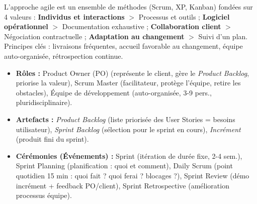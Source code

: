 \documentclass[11pt]{article}
\newcommand{\cle}[1]{{\popxbold\color{popdark}#1}}
\begin{document}
\begin{definition}
L'\cle{approche agile} est un ensemble de méthodes (Scrum, XP, Kanban) fondées sur 4 valeurs : \textbf{Individus et interactions} $>$ Processus et outils ; \textbf{Logiciel opérationnel} $>$ Documentation exhaustive ; \textbf{Collaboration client} $>$ Négociation contractuelle ; \textbf{Adaptation au changement} $>$ Suivi d'un plan. Principes clés : livraisons fréquentes, accueil favorable au changement, équipe auto-organisée, rétrospection continue.
\end{definition}

\begin{exemplebox}
\begin{itemize}
    \item \textbf{Rôles :} \cle{Product Owner (PO)} (représente le client, gère le \textit{Product Backlog}, priorise la valeur), \cle{Scrum Master} (facilitateur, protège l'équipe, retire les obstacles), \cle{Équipe de développement} (auto-organisée, 3-9 pers., pluridisciplinaire).
    \item \textbf{Artefacts :} \textit{Product Backlog} (liste priorisée des \cle{User Stories} = besoins utilisateur), \textit{Sprint Backlog} (sélection pour le sprint en cours), \textit{Incrément} (produit fini du sprint).
    \item \textbf{Cérémonies (Événements) :} \cle{Sprint} (itération de durée fixe, 2-4 sem.), \cle{Sprint Planning} (planification : quoi et comment), \cle{Daily Scrum} (point quotidien 15 min : quoi fait ? quoi ferai ? blocages ?), \cle{Sprint Review} (démo incrément + feedback PO/client), \cle{Sprint Retrospective} (amélioration processus équipe).
\end{itemize}
\end{exemplebox}
\end{document}
